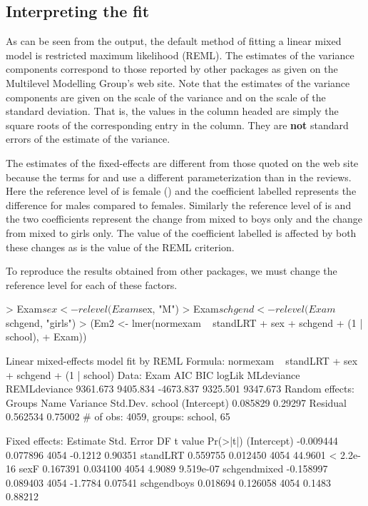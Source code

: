 \documentclass[12pt]{article}
\begin{document}
\subsection{Interpreting the fit}
\label{sec:ExamInterpret}

As can be seen from the output, the default method of fitting a linear
mixed model is restricted maximum likelihood (REML).  The estimates of
the variance components correspond to those reported by other packages
as given on the Multilevel Modelling Group's web site.  Note that the
estimates of the variance components are given on the scale of the
variance and on the scale of the standard deviation.  That is, the
values in the column headed  are simply the square
roots of the corresponding entry in the  column.  They
are \textbf{not} standard errors of the estimate of the variance.

The estimates of the fixed-effects are different from those quoted on
the web site because the terms for  and  use a
different parameterization than in the reviews.  Here the reference
level of  is female () and the coefficient labelled
 represents the difference for males compared to females.
Similarly the reference level of  is  and
the two coefficients represent the change from mixed to boys only and
the change from mixed to girls only.  The value of the coefficient
labelled  is affected by both these changes as is the
value of the REML criterion.

To reproduce the results obtained from other packages, we must change
the reference level for each of these factors.

\begin{Schunk}
\begin{Sinput}
> Exam$sex <- relevel(Exam$sex, "M")
> Exam$schgend <- relevel(Exam$schgend, "girls")
> (Em2 <- lmer(normexam ~ standLRT + sex + schgend + (1 | school), 
+     Exam))
\end{Sinput}
\begin{Soutput}
Linear mixed-effects model fit by REML
Formula: normexam ~ standLRT + sex + schgend + (1 | school) 
   Data: Exam 
      AIC      BIC    logLik MLdeviance REMLdeviance
 9361.673 9405.834 -4673.837   9325.501     9347.673
Random effects:
 Groups   Name        Variance Std.Dev.
 school   (Intercept) 0.085829 0.29297 
 Residual             0.562534 0.75002 
# of obs: 4059, groups: school, 65

Fixed effects:
                Estimate  Std. Error   DF t value  Pr(>|t|)
(Intercept)    -0.009444    0.077896 4054 -0.1212   0.90351
standLRT        0.559755    0.012450 4054 44.9601 < 2.2e-16
sexF            0.167391    0.034100 4054  4.9089 9.519e-07
schgendmixed   -0.158997    0.089403 4054 -1.7784   0.07541
schgendboys     0.018694    0.126058 4054  0.1483   0.88212
\end{Soutput}
\end{Schunk}
\end{document}
